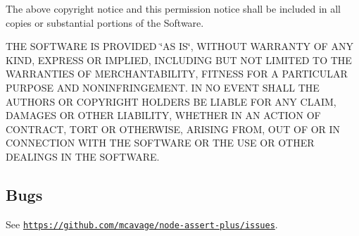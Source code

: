 The above copyright notice and this permission notice shall be included in all copies or substantial portions of the Software.

T\+HE S\+O\+F\+T\+W\+A\+RE IS P\+R\+O\+V\+I\+D\+ED \char`\"{}\+A\+S I\+S\char`\"{}, W\+I\+T\+H\+O\+UT W\+A\+R\+R\+A\+N\+TY OF A\+NY K\+I\+ND, E\+X\+P\+R\+E\+SS OR I\+M\+P\+L\+I\+ED, I\+N\+C\+L\+U\+D\+I\+NG B\+UT N\+OT L\+I\+M\+I\+T\+ED TO T\+HE W\+A\+R\+R\+A\+N\+T\+I\+ES OF M\+E\+R\+C\+H\+A\+N\+T\+A\+B\+I\+L\+I\+TY, F\+I\+T\+N\+E\+SS F\+OR A P\+A\+R\+T\+I\+C\+U\+L\+AR P\+U\+R\+P\+O\+SE A\+ND N\+O\+N\+I\+N\+F\+R\+I\+N\+G\+E\+M\+E\+NT. IN NO E\+V\+E\+NT S\+H\+A\+LL T\+HE A\+U\+T\+H\+O\+RS OR C\+O\+P\+Y\+R\+I\+G\+HT H\+O\+L\+D\+E\+RS BE L\+I\+A\+B\+LE F\+OR A\+NY C\+L\+A\+IM, D\+A\+M\+A\+G\+ES OR O\+T\+H\+ER L\+I\+A\+B\+I\+L\+I\+TY, W\+H\+E\+T\+H\+ER IN AN A\+C\+T\+I\+ON OF C\+O\+N\+T\+R\+A\+CT, T\+O\+RT OR O\+T\+H\+E\+R\+W\+I\+SE, A\+R\+I\+S\+I\+NG F\+R\+OM, O\+UT OF OR IN C\+O\+N\+N\+E\+C\+T\+I\+ON W\+I\+TH T\+HE S\+O\+F\+T\+W\+A\+RE OR T\+HE U\+SE OR O\+T\+H\+ER D\+E\+A\+L\+I\+N\+GS IN T\+HE S\+O\+F\+T\+W\+A\+RE.

\subsection*{Bugs}

See \href{https://github.com/mcavage/node-assert-plus/issues}{\tt https\+://github.\+com/mcavage/node-\/assert-\/plus/issues}. 
